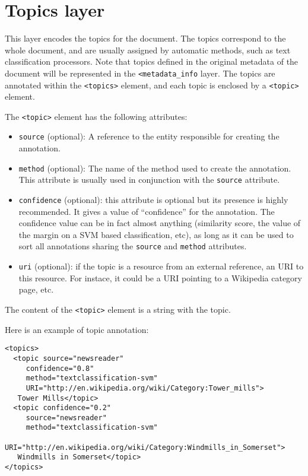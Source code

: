 
\section{Topics layer}
\label{sec:topics-layer}

This layer encodes the topics for the document. The topics correspond
to the whole document, and are usually assigned by automatic methods,
such as text classification processors. Note that topics defined in the original metadata of the document will be represented in the \texttt{<metadata_info} layer. 
The topics are annotated within the \texttt{<topics>} element, and each topic is enclosed by a
\texttt{<topic>} element.

The \texttt{<topic>} element has the following attributes:
\begin{itemize}
\item \texttt{source} (optional): A reference to the entity
  responsible for creating the annotation.
\item \texttt{method} (optional): The name of the method used to
  create the annotation. This attribute is usually used in conjunction
  with the \texttt{source} attribute.
\item \texttt{confidence} (optional): this attribute is optional but
  its presence is highly recommended. It gives a value of
  ``confidence'' for the annotation. The confidence value can be in
  fact almost anything (similarity score, the value of the margin on a
  SVM based classification, etc), as long as it can be used to sort
  all annotations sharing the \texttt{source} and \texttt{method}
  attributes.
\item \texttt{uri} (optional): if the topic is a resource
  from an external reference, an URI to this resource. For instace, it
  could be a URI pointing to a Wikipedia category page, etc.
\end{itemize}

The content of the \texttt{<topic>} element is a string with the
topic.

Here is an example of topic annotation:

\begin{Verbatim}
<topics>
  <topic source="newsreader"
	 confidence="0.8"
	 method="textclassification-svm"
	 URI="http://en.wikipedia.org/wiki/Category:Tower_mills">
   Tower Mills</topic>
  <topic confidence="0.2"
	 source="newsreader"
	 method="textclassification-svm"
	 URI="http://en.wikipedia.org/wiki/Category:Windmills_in_Somerset">
   Windmills in Somerset</topic>
</topics>
\end{Verbatim}


